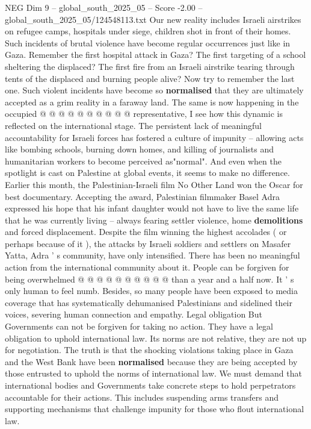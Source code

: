\begin{textsample}{NEG Dim 9 – global\_south\_2025\_05 – Score -2.00 – global\_south\_2025\_05/124548113.txt}
Our new reality includes Israeli airstrikes on refugee camps, hospitals under siege, children shot in front of their homes.
Such incidents of brutal violence have become regular occurrences just like in Gaza.
Remember the first hospital attack in Gaza?
The first targeting of a school sheltering the displaced?
The first fire from an Israeli airstrike tearing through tents of the displaced and burning people alive?
Now try to remember the last one.
Such violent incidents have become so \textbf{normalised} that they are ultimately accepted as a grim reality in a faraway land.
The same is now happening in the occupied @ @ @ @ @ @ @ @ @ @ representative, I see how this dynamic is reflected on the international stage.
The persistent lack of meaningful accountability for Israeli forces has fostered a culture of impunity -- allowing acts like bombing schools, burning down homes, and killing of journalists and humanitarian workers to become perceived as"normal".
And even when the spotlight is cast on Palestine at global events, it seems to make no difference.
Earlier this month, the Palestinian-Israeli film No Other Land won the Oscar for best documentary.
Accepting the award, Palestinian filmmaker Basel Adra expressed his hope that his infant daughter would not have to live the same life that he was currently living -- always fearing settler violence, home \textbf{demolitions} and forced displacement.
Despite the film winning the highest accolades ( or perhaps because of it ), the attacks by Israeli soldiers and settlers on Masafer Yatta, Adra ' s community, have only intensified.
There has been no meaningful action from the international community about it.
People can be forgiven for being overwhelmed @ @ @ @ @ @ @ @ @ @ than a year and a half now.
It ' s only human to feel numb.
Besides, so many people have been exposed to media coverage that has systematically dehumanised Palestinians and sidelined their voices, severing human connection and empathy.
Legal obligation But Governments can not be forgiven for taking no action.
They have a legal obligation to uphold international law.
Its norms are not relative, they are not up for negotiation.
The truth is that the shocking violations taking place in Gaza and the West Bank have been \textbf{normalised} because they are being accepted by those entrusted to uphold the norms of international law.
We must demand that international bodies and Governments take concrete steps to hold perpetrators accountable for their actions.
This includes suspending arms transfers and supporting mechanisms that challenge impunity for those who flout international law.

\end{textsample}
